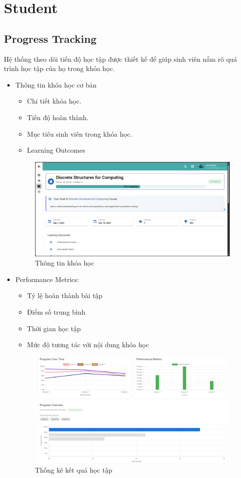 \section{Student}
\subsection{Progress Tracking}
Hệ thống theo dõi tiến độ học tập được thiết kế để giúp sinh viên nắm rõ quá trình học tập của họ trong khóa học.
\begin{itemize}
    \item Thông tin khóa học cơ bản
    \begin{itemize}
        \item Chi tiết khóa học.
        \item Tiến độ hoàn thành.
        \item Mục tiêu sinh viên trong khóa học.
        \item Learning Outcomes
    \end{itemize}
    \begin{figure}[H]
        \centering
        \includegraphics[width=0.8\linewidth]{images/progress_info_course.png}
        \caption{Thông tin khóa học}
        \label{fig:enter-label}
    \end{figure}
    \item Performance Metrics:
    \begin{itemize}
        \item Tỷ lệ hoàn thành bài tập
        \item Điểm số trung bình
        \item Thời gian học tập
        \item Mức độ tương tác với nội dung khóa học
    \end{itemize}
    \begin{figure}[H]
        \centering
        \includegraphics[width=0.8\linewidth]{images/progress_statistic.png}
        \caption{Thống kê kết quả học tập}
        \label{fig:enter-label}
    \end{figure}
\end{itemize}
